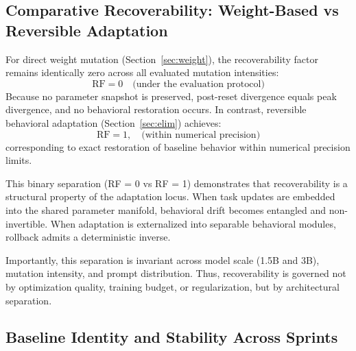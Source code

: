 \documentclass{article}
\begin{document}
	
	\subsection{Comparative Recoverability: Weight-Based vs Reversible Adaptation}
	\label{sec:rf}
	
	\begin{table}[H]
		\centering
		\footnotesize
		
		\vspace{5pt}
		\caption{
			Recoverability factor comparison across adaptation mechanisms.
			Weight-based adaptation exhibits zero recoverability (RF = 0),
			while reversible behavioral adaptation achieves exact recovery (RF = 1) within numerical precision limits.
		}
		\label{tab:rfc}
	\end{table}
	
	\FloatBarrier
	
	For direct weight mutation (Section~\ref{sec:weight}), the recoverability factor remains identically zero across all evaluated mutation intensities:
	\[
	\mathrm{RF} = 0 \quad \text{(under the evaluation protocol)}
	\]
	Because no parameter snapshot is preserved, post-reset divergence equals peak divergence, and no behavioral restoration occurs. In contrast, reversible behavioral adaptation (Section~\ref{sec:elim}) achieves:
	\[
	\mathrm{RF} = 1, \quad \text{(within numerical precision)}
	\]
	corresponding to exact restoration of baseline behavior
	within numerical precision limits.
	
	This binary separation (RF = 0 vs RF = 1)
	demonstrates that recoverability is a structural property of
	the adaptation locus.
	When task updates are embedded into the shared parameter manifold,
	behavioral drift becomes entangled and non-invertible.
	When adaptation is externalized into separable behavioral modules,
	rollback admits a deterministic inverse.
	
	Importantly, this separation is invariant across model scale
	(1.5B and 3B), mutation intensity, and prompt distribution.
	Thus, recoverability is governed not by optimization quality,
	training budget, or regularization,
	but by architectural separation.
	
	\subsection{Baseline Identity and Stability Across Sprints}
	\label{sec:baseline}
	
\end{document}
